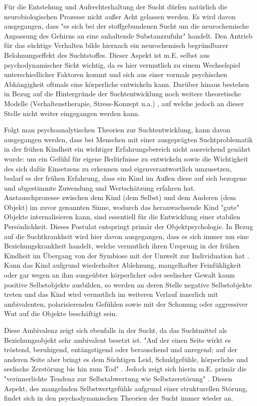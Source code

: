 Für die Entstehung und Aufrechterhaltung der Sucht dürfen natürlich die neurobiologischen Prozesse nicht außer Acht gelassen werden. Es wird davon ausgegangen, dass "es sich bei der stoffgebundenen Sucht um die neurochemische Anpassung des Gehirns an eine anhaltende Substanzzufuhr" \autocite[14]{tretter2008} handelt. Den Antrieb für das süchtige Verhalten bilde hiernach ein neurochemisch begründbarer Belohnungseffekt des Suchtstoffes. Dieser Aspekt ist m.E. selbst aus psychodynamischer Sicht wichtig, da es hier vermutlich zu einem Wechselspiel unterschiedlicher Faktoren kommt und sich aus einer vormals psychischen Abhängigkeit oftmals eine körperliche entwickeln kann.
Darüber hinaus bestehen in Bezug auf die Hintergründe der Suchtentwicklung noch weitere theoretische Modelle (Verhaltenstherapie, Stress-Konzept u.a.) \autocite[vgl.][38ff.]{tretter2008}, auf welche jedoch an dieser Stelle nicht weiter eingegangen werden kann.
 
Folgt man psychoanalytischen Theorien zur Suchtentwicklung, kann davon ausgegangen werden, dass bei Menschen mit einer ausgeprägten Suchtproblematik in der frühen Kindheit ein wichtiger Erfahrungsbereich nicht ausreichend genährt wurde: um ein Gefühl für eigene Bedürfnisse zu entwickeln sowie die Wichtigkeit des sich dafür Einsetzens zu erkennen und eigenverantwortlich umzusetzen, bedarf es der frühen Erfahrung, dass ein Kind im Außen diese auf sich bezogene und abgestimmte Zuwendung und Wertschätzung erfahren hat. Austauschprozesse zwischen dem Kind (dem Selbst) und dem Anderen (dem Objekt) im zuvor genannten Sinne, wodurch das heranwachsende Kind "gute" Objekte internalisieren kann, sind essentiell für die Entwicklung einer stabilen Persönlichkeit. Dieses Postulat entspringt primär der Objektpsychologie. In Bezug auf die Suchtkrankheit wird hier davon ausgegangen, dass es sich immer um eine Beziehungskrankheit handelt, welche vermutlich ihren Ursprung in der frühen Kindheit im Übergang von der Symbiose mit der Umwelt zur Individuation hat \autocite[vgl.][9]{weidlinger2012}. Kann das Kind aufgrund wiederholter Ablehnung, mangelhafter Feinfühligkeit oder gar wegen an ihm ausgeübter körperlicher oder seelischer Gewalt kaum positive Selbstobjekte ausbilden, so werden an deren Stelle negative Selbstobjekte treten und das Kind wird vermutlich im weiteren Verlauf innerlich mit ambivalenten, polarisierenden Gefühlen sowie mit der Schonung oder aggressiver Wut auf die Objekte beschäftigt sein\autocite[vgl.][10]{weidlinger2012}. 

Diese Ambivalenz zeigt sich ebenfalls in der Sucht, da das Suchtmittel als Beziehungsobjekt sehr ambivalent besetzt ist. "Auf der einen Seite wirkt es tröstend, beruhigend, entängstigend oder berauschend und anregend; auf der anderen Seite aber bringt es dem Süchtigen Leid, Schuldgefühle, körperliche und seelische Zerstörung bis hin zum Tod" \autocite[175]{mentzos2011}. Jedoch zeigt sich hierin m.E. primär die "verinnerlichte Tendenz zur Selbstabwertung wie Selbstzerstörung" \autocite[10]{weidlinger2012}. Diesen Aspekt, des mangelnden Selbstwertgefühls aufgrund einer strukturellen Störung, findet sich in den psychodynamischen Theorien der Sucht immer wieder an. 

